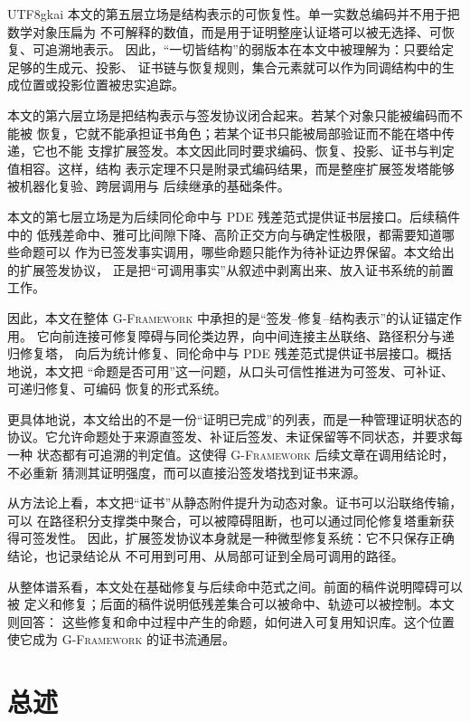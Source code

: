 \documentclass[12pt]{article}
\newcommand{\GFramework}{\textsc{G-Framework}}
\begin{document}
\begin{CJK*}{UTF8}{gkai}
本文的第五层立场是结构表示的可恢复性。单一实数总编码并不用于把数学对象压扁为
不可解释的数值，而是用于证明整座认证塔可以被无选择、可恢复、可追溯地表示。
因此，“一切皆结构”的弱版本在本文中被理解为：只要给定足够的生成元、投影、
证书链与恢复规则，集合元素就可以作为同调结构中的生成位置或投影位置被忠实追踪。

本文的第六层立场是把结构表示与签发协议闭合起来。若某个对象只能被编码而不能被
恢复，它就不能承担证书角色；若某个证书只能被局部验证而不能在塔中传递，它也不能
支撑扩展签发。本文因此同时要求编码、恢复、投影、证书与判定值相容。这样，结构
表示定理不只是附录式编码结果，而是整座扩展签发塔能够被机器化复验、跨层调用与
后续继承的基础条件。

本文的第七层立场是为后续同伦命中与 PDE 残差范式提供证书层接口。后续稿件中的
低残差命中、雅可比间隙下降、高阶正交方向与确定性极限，都需要知道哪些命题可以
作为已签发事实调用，哪些命题只能作为待补证边界保留。本文给出的扩展签发协议，
正是把“可调用事实”从叙述中剥离出来、放入证书系统的前置工作。

因此，本文在整体 \GFramework{} 中承担的是“签发--修复--结构表示”的认证锚定作用。
它向前连接可修复障碍与同伦类边界，向中间连接主丛联络、路径积分与递归修复塔，
向后为统计修复、同伦命中与 PDE 残差范式提供证书层接口。概括地说，本文把
“命题是否可用”这一问题，从口头可信性推进为可签发、可补证、可递归修复、可编码
恢复的形式系统。

更具体地说，本文给出的不是一份“证明已完成”的列表，而是一种管理证明状态的
协议。它允许命题处于来源直签发、补证后签发、未证保留等不同状态，并要求每一种
状态都有可追溯的判定值。这使得 \GFramework{} 后续文章在调用结论时，不必重新
猜测其证明强度，而可以直接沿签发塔找到证书来源。

从方法论上看，本文把“证书”从静态附件提升为动态对象。证书可以沿联络传输，可以
在路径积分支撑类中聚合，可以被障碍阻断，也可以通过同伦修复塔重新获得可签发性。
因此，扩展签发协议本身就是一种微型修复系统：它不只保存正确结论，也记录结论从
不可用到可用、从局部可证到全局可调用的路径。

从整体谱系看，本文处在基础修复与后续命中范式之间。前面的稿件说明障碍可以被
定义和修复；后面的稿件说明低残差集合可以被命中、轨迹可以被控制。本文则回答：
这些修复和命中过程中产生的命题，如何进入可复用知识库。这个位置使它成为
\GFramework{} 的证书流通层。

\setcounter{tocdepth}{2}
\setcounter{secnumdepth}{2}
\tableofcontents
\clearpage

\section{总述}


\end{CJK*}
\end{document}
